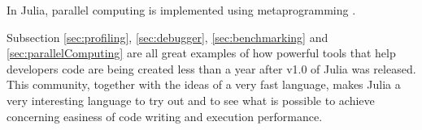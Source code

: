 In Julia, parallel computing is implemented using metaprogramming \emph{\citep{ParallellComputing}}.  


Subsection \ref{sec:profiling}, \ref{sec:debugger}, \ref{sec:benchmarking} and \ref{sec:parallelComputing} are all great examples of how powerful tools that help developers code are being created less than a year after v1.0 of Julia was released. This community, together with the ideas of a very fast language, makes Julia a very interesting language to try out and to see what is possible to achieve concerning easiness of code writing and execution performance.